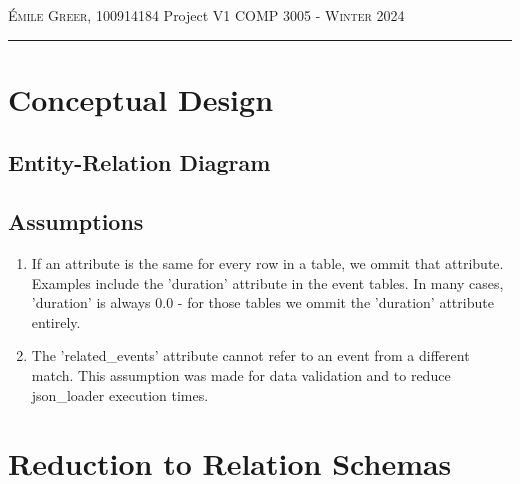 \documentclass[12pt]{article}
\begin{document}
\thispagestyle{empty}

{\scshape Émile Greer, 100914184} \hfill {Project V1 \scshape \large} \hfill {\scshape COMP 3005 - Winter 2024}
 
\smallskip
\hrule
\bigskip

\section*{Conceptual Design}
\subsection*{Entity-Relation Diagram}

\subsection*{Assumptions}
\begin{enumerate}
    \item If an attribute is the same for every row in a table, we ommit that attribute. Examples include the 'duration' attribute in the event tables. In many cases, 'duration' is always 0.0 - for those tables we ommit the 'duration' attribute entirely.
    \item The 'related\_events' attribute cannot refer to an event from a different match. This assumption was made for data validation and to reduce json\_loader execution times.
\end{enumerate}

\section*{Reduction to Relation Schemas}
\end{document}
